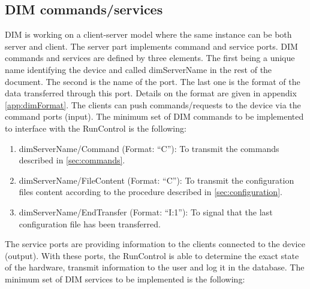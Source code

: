 \documentclass[a4paper]{article}
\begin{document}
\subsection{DIM commands/services} \label{sec:DIM}
DIM is working on a client-server model where the same instance can be both server and client.
The server part implements command and service ports. DIM commands and
services are defined by three elements. The first being a unique name
identifying the device and called dimServerName in the rest of the document.
The second is the name of the port. The last one is the format of the data
transferred through this port. Details on the format are given in appendix
\ref{app:dimFormat}. The clients can push commands/requests to the device via
the command ports (input). The minimum set of DIM commands to be implemented to
interface with the RunControl is the following:
\begin{enumerate}[label=\textbf{CMD.\arabic*}]
	\item \label{cmd:command} dimServerName/Command (Format: ``C''): To transmit
	the commands described in \ref{sec:commands}.
	\item \label{cmd:fileContent} dimServerName/FileContent (Format: ``C''): To
	transmit the configuration files content according to the procedure described
	in \ref{sec:configuration}.
	\item \label{cmd:endTransfer} dimServerName/EndTransfer (Format: ``I:1''): To
	signal that the last configuration file has been transferred.
\end{enumerate}
The service ports are providing information to the clients connected to the device (output).
With these ports, the RunControl is able to determine the exact state of the hardware,
transmit information to the user and log it in the database. The minimum set of DIM services to
be implemented is the following:
\end{document}
